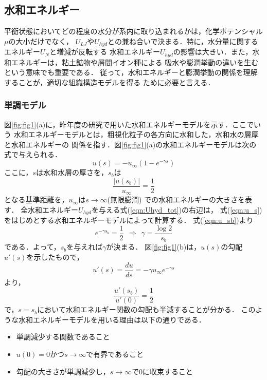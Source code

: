 \subsection{水和エネルギー}
平衡状態においてどの程度の水分が系内に取り込まれるかは，化学ポテンシャル$\mu$の大小だけでなく，
$U_{LJ}$や$U_{hyd}$との兼ね合いで決まる．特に，水分量に関するエネルギー$U_N$と増減が反転する
水和エネルギー$U_{hyd}$の影響は大きい．また，水和エネルギーは，粘土鉱物や層間イオン種による
吸水や膨潤挙動の違いを生むという意味でも重要である．
従って，水和エネルギーと膨潤挙動の関係を理解することが，適切な組織構造モデルを得る
ために必要と言える．
%
\subsubsection{単調モデル}
図\ref{fig:fig1}(a)に，昨年度の研究で用いた水和エネルギーモデルを示す．ここでいう
水和エネルギーモデルとは，粗視化粒子の各方向に水和した，水和水の層厚と水和エネルギーの
関係を指す．図\ref{fig:fig1}(a)の水和エネルギーモデルは次の式で与えられる．
\begin{equation}
	u(s)=-u_{\infty} \left(1-e^{-\gamma s} \right)
	\label{eqn:u_s}
\end{equation}
ここに，$s$は水和水層の厚さを，$s_b$は
\begin{equation}
	\frac{\left| u(s_b) \right|}{u_{\infty}}=\frac{1}{2}
	\label{eqn:u_sb}
\end{equation}
となる基準距離を，$u_{\infty}$は$s\rightarrow \infty$(無限膨潤)
での水和エネルギーの大きさを表す．
全水和エネルギー$U_{hyd}$を与える式(\ref{eqn:Uhyd_tot})の右辺は，
式(\ref{eqn:u_s})をはじめとする水和エネルギーモデルによって計算する．
式(\ref{eqn:u_sb})より
\begin{equation}
	e^{-\gamma s_b}=\frac{1}{2} \ \ \Rightarrow \ \
	\gamma=\frac{\log 2}{s_b}
	\label{eqn:}
\end{equation}
である．よって，$s_b$を与えれば$\gamma$が決まる．
図\ref{fig:fig1}(b)は，$u(s)$の勾配$u'(s)$を示したもので，
\begin{equation}
	u'(s)=\frac{du}{ds}=-\gamma u_{\infty} e^{-\gamma s}
	\label{eqn:ud_s}
\end{equation}
より，
\begin{equation}
	\frac{u'(s_b)}{u'(0)}=\frac{1}{2}
	\label{eqn:ud_half}
\end{equation}
で，$s=s_b$において水和エネルギー関数の勾配も半減することが分かる．
このような水和エネルギーモデルを用いる理由は以下の通りである．
\begin{itemize}
\item
	単調減少する関数であること
\item
	$u(0)=0$かつ$s\rightarrow \infty$で有界であること
\item
	勾配の大きさが単調減少し，$s\rightarrow \infty$で0に収束すること
\end{itemize}
